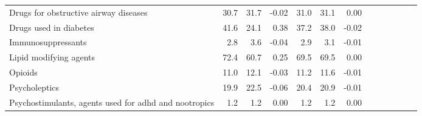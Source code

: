 \documentclass[11pt,]{article}
\begin{document}
\begin{longtable}{lrrrrrrrrrrrr}
      Drugs for obstructive airway diseases & 30.7 & 31.7 & -0.02 & 31.0 & 31.1 &  0.00 \\ 
      Drugs used in diabetes & 41.6 & 24.1 &  0.38 & 37.2 & 38.0 & -0.02 \\ 
      Immunosuppressants &  2.8 &  3.6 & -0.04 &  2.9 &  3.1 & -0.01 \\ 
      Lipid modifying agents & 72.4 & 60.7 &  0.25 & 69.5 & 69.5 &  0.00 \\ 
      Opioids & 11.0 & 12.1 & -0.03 & 11.2 & 11.6 & -0.01 \\ 
      Psycholeptics & 19.9 & 22.5 & -0.06 & 20.4 & 20.9 & -0.01 \\ 
      Psychostimulants, agents used for adhd and nootropics &  1.2 &  1.2 &  0.00 &  1.2 &  1.2 &  0.00 \\ 
   \bottomrule\end{longtable}
\clearpage
{}
\end{document}
